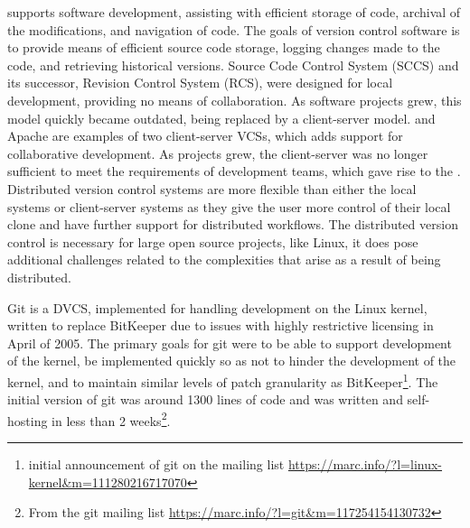  supports software development,
assisting with efficient storage of code, archival of the modifications,
and navigation of code. The goals of version control software is to
provide means of efficient source code storage, logging changes made to
the code, and retrieving historical versions. Source Code Control System
(SCCS) and its successor, Revision Control System (RCS), were designed
for local development, providing no means of collaboration. As software
projects grew, this model quickly became outdated, being replaced by a
client-server model.  and Apache
 are examples of two client-server VCSs, which
adds support for collaborative development. As projects grew, the
client-server was no longer sufficient to meet the requirements of
development teams, which gave rise to the . Distributed version control systems are more
flexible than either the local systems or client-server systems as they
give the user more control of their local clone and have further support
for distributed workflows. The distributed version control is necessary
for large open source projects, like Linux, it does pose additional
challenges related to the complexities that arise as a result of being
distributed.

Git is a DVCS, implemented for handling development on the Linux kernel,
written to replace BitKeeper due to issues with highly restrictive
licensing in April of 2005. The primary goals for git were to be able to
support development of the kernel, be implemented quickly so as not to
hinder the development of the kernel, and to maintain similar levels of
patch granularity as BitKeeper\footnote{initial announcement of git on
  the mailing list
  \url{https://marc.info/?l=linux-kernel&m=111280216717070}}. The
initial version of git was around 1300 lines of code and was written and
self-hosting in less than 2 weeks\footnote{From the git mailing list
  \url{https://marc.info/?l=git&m=117254154130732}}.

